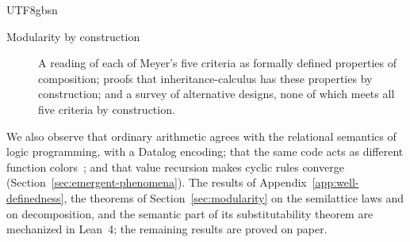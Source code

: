 \begin{CJK*}{UTF8}{gbsn}
\begin{description}
  \item[Modularity by construction] A reading of each of Meyer's five criteria as formally defined
    properties of composition; proofs that inheritance-calculus has these properties by construction; and
    a survey of alternative designs, none of which meets all five criteria by construction.
\end{description}
We also observe that ordinary arithmetic agrees with the relational semantics of logic programming, with
a Datalog encoding; that the same code acts as different function
colors~\cite{nystrom2015-function-color}; and that value recursion makes cyclic rules converge
(Section~\ref{sec:emergent-phenomena}).
The results of Appendix~\ref{app:well-definedness}, the theorems of Section~\ref{sec:modularity} on the
semilattice laws and on decomposition, and the semantic part of its substitutability theorem are
mechanized in Lean~4; the remaining results
are proved on paper.
\fi


\end{CJK*}
